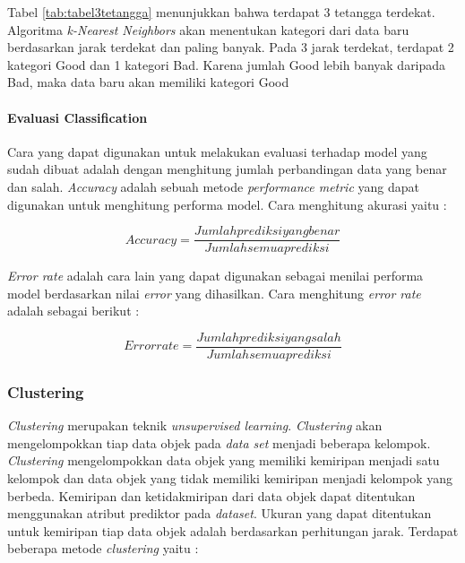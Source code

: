 \documentclass[a4paper,twoside]{article}
\begin{document}
\begin{enumerate}
Tabel \ref{tab:tabel3tetangga} menunjukkan bahwa terdapat 3 tetangga terdekat. Algoritma \textit{k-Nearest Neighbors} akan menentukan kategori dari data baru berdasarkan jarak terdekat dan paling banyak. Pada 3 jarak terdekat, terdapat 2 kategori Good dan 1 kategori Bad. Karena jumlah Good lebih banyak daripada Bad, maka data baru akan memiliki kategori Good

 
\paragraph{Evaluasi Classification} 
Cara yang dapat digunakan untuk melakukan evaluasi terhadap model yang sudah dibuat adalah dengan menghitung jumlah perbandingan data yang benar dan salah. \textit{Accuracy} adalah sebuah metode \textit{performance metric} yang dapat digunakan untuk menghitung performa model. Cara menghitung akurasi yaitu : 

\begin{displaymath}
    Accuracy  = \frac{Jumlah prediksi yang benar}{Jumlah semua prediksi}
\end{displaymath} 

\textit{Error rate} adalah cara lain yang dapat digunakan sebagai menilai performa model berdasarkan nilai \textit{error} yang dihasilkan. Cara menghitung \textit{error rate} adalah sebagai berikut : 

\begin{displaymath}
 Error rate = \frac{Jumlah prediksi yang salah}{Jumlah semua prediksi}
\end{displaymath}

\subsubsection{Clustering}
\textit{Clustering} merupakan teknik \textit{unsupervised learning}. \textit{Clustering} akan mengelompokkan tiap data objek pada \textit{data set} menjadi beberapa kelompok. \textit{Clustering} mengelompokkan data objek yang memiliki kemiripan menjadi satu kelompok dan data objek yang tidak memiliki kemiripan menjadi kelompok yang berbeda. Kemiripan dan ketidakmiripan dari data objek dapat ditentukan menggunakan atribut prediktor pada \textit{dataset}. Ukuran yang dapat ditentukan untuk kemiripan tiap data objek adalah berdasarkan perhitungan jarak. Terdapat beberapa metode \textit{clustering} yaitu : 

\begin{itemize}


\end{itemize}
\end{enumerate}
\end{document}
